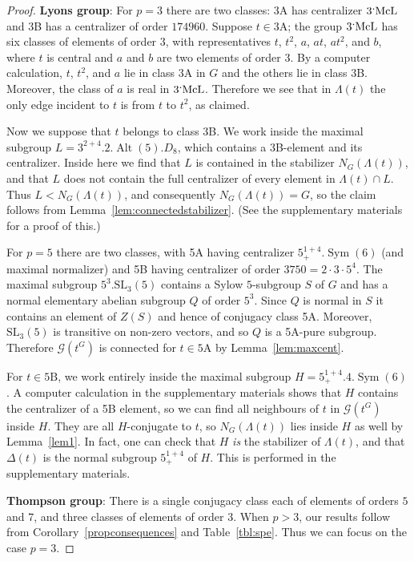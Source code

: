 \documentclass[11pt,a4paper]{amsart}
\theoremstyle{plain}
\theoremstyle{definition}
\theoremstyle{remark}
\newcounter{claim}[definition]
\theoremstyle{remark}
\theoremstyle{remark}
\theoremstyle{definition}
\newcommand{\ns}{\mathbin{\mspace{-4mu}\vcenter{\hbox{\raisebox{1ex}{$\cdot$}}}\mspace{-4mu}}}
\newcommand{\GG}{\mathcal{G}}
\DeclareMathOperator{\McL}{McL}
\DeclareMathOperator{\Alt}{Alt}
\DeclareMathOperator{\Sym}{Sym}
\begin{document}
\begin{proof}
\medskip
\textbf{Lyons group}: For $p=3$ there are two classes: 3A has centralizer $3\ns\McL$ and 3B has a centralizer of order $174960$. Suppose $t\in\mathrm{3A}$; the group $3\ns\McL$ has six classes of elements of order $3$, with representatives $t$, $t^2$, $a$, $at$, $at^2$, and $b$, where $t$ is central and $a$ and $b$ are two elements of order $3$. By a computer calculation, $t$, $t^2$, and $a$ lie in class 3A in $G$ and the others lie in class 3B. Moreover, the class of $a$ is real in $3\ns\McL$. Therefore we see that in $\Lambda(t)$ the only edge incident to $t$ is from $t$ to $t^2$, as claimed.

Now we suppose that $t$ belongs to class 3B. We work inside the maximal subgroup $L=3^{2+4}.2.\Alt(5).D_8$, which contains a 3B-element and its centralizer. Inside here we find that $L$ is contained in the stabilizer $N_G(\Lambda(t))$, and that $L$ does not contain the full centralizer of every element in $\Lambda(t)\cap L$. Thus $L<N_G(\Lambda(t))$, and consequently $N_G(\Lambda(t))=G$, so the claim follows from Lemma~\ref{lem:connectedstabilizer}. (See the supplementary materials for a proof of this.)

For $p=5$ there are two classes, with 5A having centralizer $5^{1+4}_+.\Sym(6)$ (and maximal normalizer) and 5B having centralizer of order $3750=2\cdot 3\cdot 5^4$. The maximal subgroup $5^3.\mathrm{SL}_3(5)$ contains a Sylow $5$-subgroup $S$ of $G$ and has a normal elementary abelian subgroup $Q$ of order $5^3$. Since $Q$ is normal in $S$ it contains an element of $Z(S)$ and hence of conjugacy class 5A. Moreover, $\mathrm{SL}_3(5)$ is transitive on non-zero vectors, and so $Q$ is a 5A-pure subgroup. Therefore $\GG(t^G)$ is connected for $t\in\mathrm{5A}$ by Lemma~\ref{lem:maxcent}.

For $t\in\mathrm{5B}$, we work entirely inside the maximal subgroup $H=5^{1+4}_+.4.\Sym(6)$. A computer calculation in the supplementary materials shows that $H$ contains the centralizer of a 5B element, so we can find all neighbours of $t$ in $\GG(t^G)$ inside $H$. They are all $H$-conjugate to $t$, so $N_G(\Lambda(t))$ lies inside $H$ as well by Lemma~\ref{lem1}. In fact, one can check that $H$ \emph{is} the stabilizer of $\Lambda(t)$, and that $\Delta(t)$ is the normal subgroup $5^{1+4}_+$ of $H$. This is performed in the supplementary materials.

\medskip

\textbf{Thompson group}: There is a single conjugacy class each of elements of orders $5$ and $7$, and three classes of elements of order $3$. When $p>3$, our results follow from Corollary~\ref{propconsequences} and Table~\ref{tbl:spe}. Thus we can focus on the case $p=3$.


\end{proof}
\end{document}

